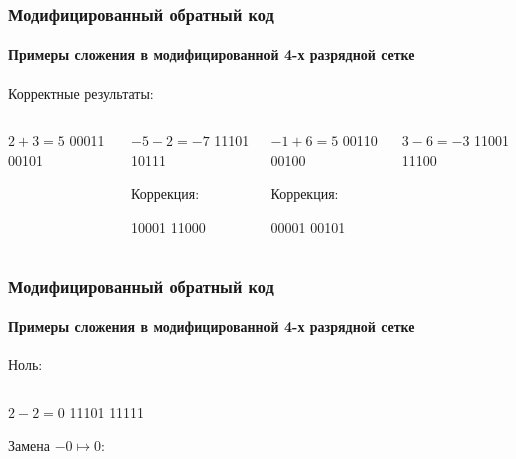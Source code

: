 \begin{frame}
    \frametitle{Модифицированный обратный код}
    \framesubtitle{Примеры сложения в модифицированной 4-х разрядной сетке}
    
    Корректные результаты:
    \begin{columns}
            \begin{block}{$2+3=5$}
                 \center
                          {00011}
                          {00101}
            \end{block}
            \begin{block}{${-5}-2=-7$}
                 \center
                          {11101}
                          {10111}
                          
                 Коррекция:
                          
                          {10001}
                          {11000}
            \end{block}
            \begin{block}{${-1}+6=5$}
                 \center
                          {00110}
                          {00100}

                 Коррекция:
                          
                          {00001}
                          {00101}
            \end{block}
            \begin{block}{$3-6={-3}$}
                 \center
                          {11001}
                          {11100}
            \end{block}
    \end{columns}
\end{frame}

\begin{frame}
    \frametitle{Модифицированный обратный код}
    \framesubtitle{Примеры сложения в модифицированной 4-х разрядной сетке}
    
    Ноль:
    \begin{columns}
            \begin{block}{$2-2=0$}
                 \center
                          {11101}
                          {11111}
                          
                 Замена $-0\mapsto 0$:
                          
            \end{block}
    \end{columns}
\end{frame}

